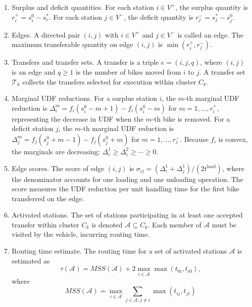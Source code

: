 \begin{enumerate}[label=(\arabic*)]
\item Surplus and deficit quantities. For each station $i\in {{V}^{+}}$, the surplus quantity is $r_{i}^{+}=s_{i}^{0}-s_{i}^{*}$. For each station $j\in {{V}^{-}}$, the deficit quantity is $r_{j}^{-}=s_{j}^{*}-s_{j}^{0}$.
\item Edges. A directed pair $(i,j)$ with $i\in {{V}^{+}}$ and $j\in {{V}^{-}}$ is called an edge. The maximum transferable quantity on edge $(i,j)$ is $\min (r_{i}^{+},r_{j}^{-})$.
\item Transfers and transfer sets. A transfer is a triple $e=(i,j,q)$, where $(i,j)$ is an edge and $q\ge 1$ is the number of bikes moved from $i$ to $j$. A transfer set ${{\mathcal{T}}_{k}}$ collects the transfers selected for execution within cluster ${{C}_{k}}$.
\item Marginal UDF reductions. For a surplus station $i$, the $m$-th marginal UDF reduction is $\Delta _{i}^{m}={{f}_{i}}(s_{i}^{0}-m+1)-{{f}_{i}}(s_{i}^{0}-m)$ for $m=1,\ldots ,r_{i}^{+}$, representing the decrease in UDF when the $m$-th bike is removed. For a deficit station $j$, the $m$-th marginal UDF reduction is $\Delta _{j}^{m}={{f}_{j}}(s_{j}^{0}+m-1)-{{f}_{j}}(s_{j}^{0}+m)$ for $m=1,\ldots ,r_{j}^{-}$. Because ${{f}_{i}}$ is convex, the marginals are decreasing: $\Delta _{i}^{1}\ge \Delta _{i}^{2}\ge \cdots \ge 0$.
\item Edge scores. The score of edge $(i,j)$ is ${{\sigma }_{ij}}=(\Delta _{i}^{1}+\Delta _{j}^{1})/(2{{t}^{\text{load}}})$, where the denominator accounts for one loading and one unloading operation. The score measures the UDF reduction per unit handling time for the first bike transferred on the edge.
\item Activated stations. The set of stations participating in at least one accepted transfer within cluster ${{C}_{k}}$ is denoted $\mathcal{A}\subseteq {{C}_{k}}$. Each member of $\mathcal{A}$ must be visited by the vehicle, incurring routing time.
\item Routing time estimate. The routing time for a set of activated stations $\mathcal{A}$ is estimated as
\begin{equation}
\tau (\mathcal{A})=MSS(\mathcal{A})+2{{\max }_{i\in \mathcal{A}}}\max ({{t}_{0i}},{{t}_{i0}}),
\end{equation}
where
\begin{equation}
MSS(\mathcal{A})={{\max }_{i\in \mathcal{A}}}\sum\limits_{j\in \mathcal{A},j\ne i}{\max }({{t}_{ij}},{{t}_{ji}})

\end{equation}
\end{enumerate}
